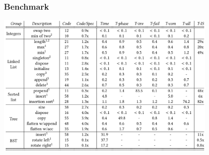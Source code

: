 \documentclass[french]{beamer}
\begin{document}
\begin{frame}
	\frametitle{Benchmark}
	\includegraphics[width=11cm]{figures/benchmark.png}
\end{frame}
\end{document}
